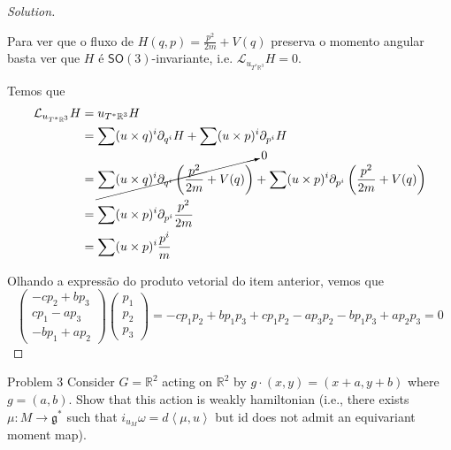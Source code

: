 \begin{proof}[Solution]
\begin{enumerate}[label=\alph*.]
	Para ver que o fluxo de $H(q,p)=\frac{p^2}{2m}+V(q)$ preserva o momento angular basta ver que $H$  é $\mathsf{SO}(3)$-invariante, i.e. $\mathcal{L}_{u_{T^*\mathbb{R}^3}}H=0$.

	Temos que 
	\begin{align*}
	\mathcal{L}_{u_{T^*\mathbb{R}^3}}H&=u_{T^*\mathbb{R}^3}H\\
	&=\sum (u \times q)^i\partial_{q^i}H+\sum (u \times p)^i\partial_{p^i}H\\
	&=\cancelto{0}{\sum (u \times q)^i\partial_{q^i}\left(\frac{p^2}{2m}+V(q)\right)}+\sum (u \times p)^i\partial_{p^i}\left(\frac{p^2}{2m}+V(q)\right)\\
	&=\sum (u \times p)^i\partial_{p^i}\frac{p^2}{2m}\\
	&=\sum (u\times p)^i \frac{p^i}{m}
	\end{align*}
\end{enumerate}
Olhando a expressão do produto vetorial do item anterior, vemos que
\[\begin{pmatrix} -cp_2+bp_3\\cp_1-ap_3\\-bp_1+ap_2 \end{pmatrix}\begin{pmatrix} p_1\\ p_2\\ p_3 \end{pmatrix} =-cp_1p_2+bp_1p_3+cp_1p_2-ap_3p_2-b p_1p_3+ap_2p_3= 0\]
\end{proof}

\begin{thing1}{Problem 3}\leavevmode
Consider $G=\mathbb{R}^2$ acting on $\mathbb{R}^2$ by $g\cdot(x,y)=(x+a,y+b)$ where $g=(a,b)$. Show that this action is weakly hamiltonian (i.e., there exists $\mu:M\to \mathfrak{g}^*$ such that $i_{u_M}\omega=d\left<\mu,u\right>$ but id does not admit an equivariant moment map).
\end{thing1}

